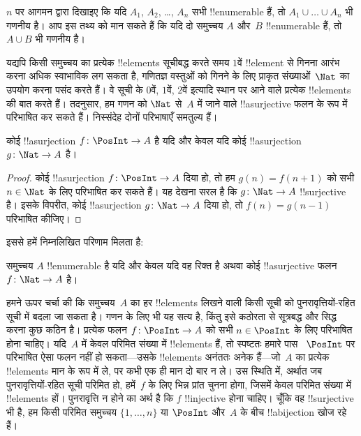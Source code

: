 \documentclass[../../../include/open-logic-section]{subfiles}
\begin{document}
\begin{prob}
  $n$ पर आगमन द्वारा दिखाइए कि यदि $A_1$, $A_2$, \dots, $A_n$ सभी
  !!{enumerable} हैं, तो $A_1 \cup \dots \cup A_n$ भी गणनीय है। आप इस
  तथ्य को मान सकते हैं कि यदि दो समुच्चय $A$ और~$B$ !!{enumerable} हैं, तो
  $A \cup
  B$ भी गणनीय है। 
\end{prob}

यद्यपि किसी समुच्चय का प्रत्येक !!{element}s सूचीबद्ध करते समय $1$वें !!{element}
से गिनना आरंभ करना अधिक स्वाभाविक लग सकता है, गणितज्ञ वस्तुओं को गिनने के लिए
प्राकृत संख्याओं~$\Nat$ का उपयोग करना पसंद करते हैं। वे सूची के $0$वें,
$1$वें, $2$वें इत्यादि स्थान पर आने वाले प्रत्येक !!{element}s की बात करते हैं। तदनुसार, हम गणन को
$\Nat$ से~$A$ में जाने वाले !!a{surjective} फलन के रूप में परिभाषित कर
सकते हैं। निस्संदेह दोनों परिभाषाएँ समतुल्य हैं।

\begin{prop}
  कोई !!a{surjection} $f\colon \PosInt \to A$ है यदि और केवल यदि कोई
  !!a{surjection} $g\colon \Nat \to A$ है।
\end{prop}

\begin{proof}
  कोई !!a{surjection} $f\colon \PosInt \to A$ दिया हो, तो हम
  $g(n) =
  f(n+1)$ को सभी $n \in \Nat$ के लिए परिभाषित कर सकते हैं। यह देखना सरल
  है कि $g\colon \Nat
  \to A$ !!{surjective} है। इसके विपरीत, कोई
  !!a{surjection} $g\colon
  \Nat \to A$ दिया हो, तो $f(n) = g(n-1)$
  परिभाषित कीजिए।
\end{proof}

इससे हमें निम्नलिखित परिणाम मिलता है:

\begin{cor}
समुच्चय $A$ !!{enumerable} है यदि और केवल यदि वह रिक्त है अथवा कोई
!!a{surjective} फलन $f\colon \Nat \to A$ है।
\end{cor}

हमने ऊपर चर्चा की कि समुच्चय~$A$ का हर !!{element}s लिखने वाली किसी सूची को
पुनरावृत्तियों-रहित सूची में बदला जा सकता है। गणन के लिए भी यह सत्य है, किंतु
इसे कठोरता से सूत्रबद्ध और सिद्ध करना कुछ कठिन है। प्रत्येक फलन
$f\colon \PosInt \to A$ को सभी $n \in
\PosInt$ के लिए परिभाषित होना चाहिए।
यदि~$A$ में केवल परिमित संख्या में !!{element}s हैं, तो स्पष्टतः हमारे पास
~$\PosInt$ पर परिभाषित ऐसा फलन नहीं हो सकता---उसके !!{element}s अनंततः अनेक
हैं---जो~$A$ का प्रत्येक !!{element}s मान के रूप में ले, पर कभी एक ही मान दो बार न ले।
उस स्थिति में, अर्थात जब पुनरावृत्तियों-रहित सूची परिमित हो, हमें~$f$ के लिए
भिन्न प्रांत चुनना होगा, जिसमें केवल परिमित संख्या में !!{element}s हों।
पुनरावृत्ति न होने का अर्थ है कि $f$ !!{injective} होना चाहिए। चूँकि वह
!!{surjective} भी है, हम किसी परिमित समुच्चय $\{1, \dots, n\}$ या
$\PosInt$ और~$A$ के बीच !!a{bijection} खोज रहे हैं।
\end{document}
